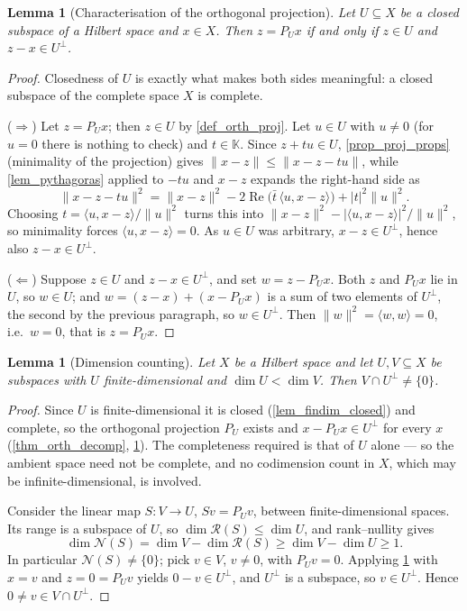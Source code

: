 \documentclass[a4paper]{report}
\theoremstyle{plain}
\newtheorem{lemma}[theorem]{Lemma}
\theoremstyle{definition}
\theoremstyle{remark}
\begin{document}
\begin{lemma}[Characterisation of the orthogonal projection]
  \label{lem_proj_characterisation}
  Let $U \subseteq X$ be a \emph{closed} subspace of a Hilbert space and $x \in X$.  Then
  $z = P_Ux$ if and only if $z \in U$ and $z-x \in U^\perp$.
\end{lemma}
\begin{proof}
  Closedness of $U$ is exactly what makes both sides meaningful: a closed subspace of the
  complete space $X$ is complete.

  ($\Rightarrow$)  Let $z = P_Ux$; then $z \in U$ by \cref{def_orth_proj}.  Let $u \in U$
  with $u \ne 0$ (for $u = 0$ there is nothing to check) and $t \in \mathbb{K}$.  Since
  $z+tu \in U$, \cref{prop_proj_props} (minimality of the projection) gives
  $\|x-z\| \le \|x-z-tu\|$, while \cref{lem_pythagoras} applied to $-tu$ and $x-z$
  expands the right-hand side as
  \[
    \|x-z-tu\|^2
      = \|x-z\|^2 - 2\operatorname{Re}\bigl(\bar t\,\langle u, x-z\rangle\bigr)
        + |t|^2\|u\|^2 .
  \]
  Choosing $t = \langle u, x-z\rangle/\|u\|^2$ turns this into
  $\|x-z\|^2 - |\langle u, x-z\rangle|^2/\|u\|^2$, so minimality forces
  $\langle u, x-z\rangle = 0$.  As $u \in U$ was arbitrary, $x - z \in U^\perp$, hence also
  $z - x \in U^\perp$.

  ($\Leftarrow$)  Suppose $z \in U$ and $z-x \in U^\perp$, and set $w = z - P_Ux$.  Both
  $z$ and $P_Ux$ lie in $U$, so $w \in U$; and $w = (z-x) + (x - P_Ux)$ is a sum of two
  elements of $U^\perp$, the second by the previous paragraph, so $w \in U^\perp$.  Then
  $\|w\|^2 = \langle w,w\rangle = 0$, i.e.\ $w = 0$, that is $z = P_Ux$.
\end{proof}


\begin{lemma}[Dimension counting]
  \label{lem_dim_count}
  Let $X$ be a Hilbert space and let $U, V \subseteq X$ be subspaces with $U$
  \emph{finite-dimensional} and $\dim U < \dim V$.  Then $V \cap U^\perp \ne \{0\}$.
\end{lemma}
\begin{proof}
  Since $U$ is finite-dimensional
  it is closed (\cref{lem_findim_closed}) and complete, so the orthogonal projection $P_U$
  exists and $x - P_Ux \in U^\perp$ for every $x$ (\cref{thm_orth_decomp},
  \cref{lem_proj_characterisation}).  The completeness required is that of $U$ alone --- so the ambient space need not be complete, and no
  codimension count in $X$, which may be infinite-dimensional, is involved.

  Consider the linear map $S \colon V \to U$, $Sv = P_Uv$, between finite-dimensional
  spaces.  Its range is a subspace of $U$, so
  $\dim \mathcal{R}(S) \le \dim U$, and
  rank--nullity gives
  \[
    \dim \mathcal{N}(S) = \dim V - \dim \mathcal{R}(S) \ge \dim V - \dim U \ge 1 .
  \]
  In particular $\mathcal{N}(S) \ne \{0\}$; pick $v \in V$, $v \ne 0$, with $P_Uv = 0$.
  Applying \cref{lem_proj_characterisation} with $x = v$ and $z = 0 = P_Uv$ yields
  $0 - v \in U^\perp$, and $U^\perp$ is a subspace, so $v \in U^\perp$.  Hence
  $0 \ne v \in V \cap U^\perp$.
\end{proof}
\end{document}
